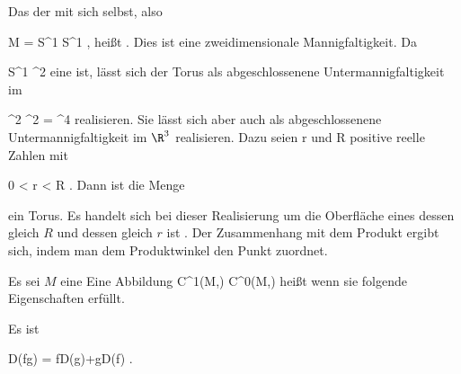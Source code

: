 {

Das
der
mit sich selbst, also

\mavergleichskette
{\vergleichskette
{ M
}
{ = }{ S^1 \times S^1
}
{  }{
}
{    }{
}
{   }{
}
}
{}{}{,}
heißt  {.} Dies ist eine zweidimensionale Mannigfaltigkeit. Da

\mavergleichskette
{\vergleichskette
{ S^1
}
{ \subset }{ \R^2
}
{  }{
}
{    }{
}
{   }{
}
}
{}{}{}
eine
ist, lässt sich der Torus als abgeschlossenene Untermannigfaltigkeit im

\mavergleichskette
{\vergleichskette
{ \R^2 \times \R^2
}
{ = }{ \R^4
}
{  }{
}
{    }{
}
{   }{
}
}
{}{}{}
realisieren. Sie lässt sich aber auch als abgeschlossenene Untermannigfaltigkeit im $\R^3$ realisieren. Dazu seien
\mathkor {} {r} {und} {R} {}
positive reelle Zahlen mit

\mavergleichskette
{\vergleichskette
{ 0
}
{ < }{ r
}
{ < }{ R
}
{    }{
}
{   }{
}
}
{}{}{.}
Dann ist die Menge

 {  }

ein Torus. Es handelt sich bei dieser Realisierung um die Oberfläche eines
 {} {}
 dessen  gleich $R$ und dessen  gleich $r$ ist
 {} {.}
Der Zusammenhang mit dem Produkt
 ergibt sich, indem man dem Produktwinkel
\mathl{( \varphi, \psi)}{} den Punkt
 zuordnet.

}


{}
{

Es sei $M$ eine
Eine Abbildung
 {C^1(M,\R) } { C^0(M,\R)
} {}
heißt
wenn sie folgende Eigenschaften erfüllt.
 {Es ist

\mavergleichskette
{\vergleichskette
{ D(fg)
}
{ = }{ fD(g)+gD(f)
}
{  }{
}
{    }{
}
{   }{
}
}
{}{}{.}
}

}


